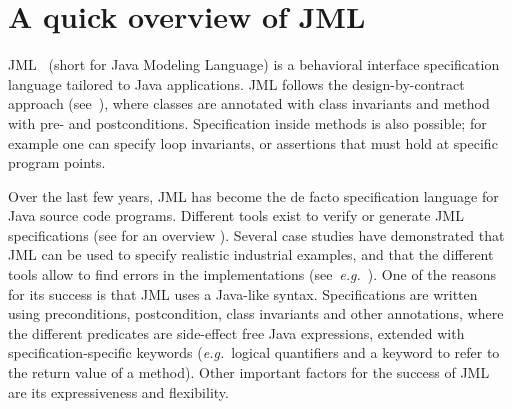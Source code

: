 


\section{A quick overview of JML} \label{BCSLprelim}
JML~\cite{JMLRefMan} (short for Java Modeling Language) is a behavioral interface specification language tailored to Java applications. JML 
follows the design-by-contract approach (see~\cite{M97oos}), where classes are annotated with class invariants and method
 with pre- and postconditions. Specification inside methods is also possible; for example one can specify loop invariants,
 or assertions that must hold at specific program points. 

Over the last few years, JML has become the de facto specification language for Java source code programs. Different
 tools exist to verify or generate JML specifications (see for an overview \cite{BurdyCCEKLLP03} ).  
 Several case studies have demonstrated that JML can be used to specify realistic
industrial examples, and that the different tools allow to find errors
in the implementations (see~\emph{e.g.}\/~\cite{BreunesseCHJ04}). One
of the reasons for its success is that JML uses a Java-like
syntax. Specifications are written using preconditions, postcondition,
class invariants and other annotations, where the different predicates
are side-effect free Java expressions, extended with
specification-specific keywords (\emph{e.g.}\ logical quantifiers and a
keyword to refer to the return value of a method). Other important
factors for the success of JML are its expressiveness and
flexibility.

